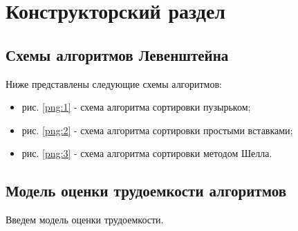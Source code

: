 \chapter{Конструкторский раздел}
\section{Схемы алгоритмов Левенштейна}
Ниже представлены следующие схемы алгоритмов:
\begin{itemize}
	\item рис. \ref{png:1} - схема алгоритма сортировки пузырьком;
	\item рис. \ref{png:2} - схема алгоритма сортировки простыми вставками;
	\item рис. \ref{png:3} - схема алгоритма сортировки методом Шелла.
\end{itemize}

\begin{figure}[H]
\end{figure} 

\begin{figure}[H]
\end{figure} 

\begin{figure}[H]
\end{figure}

\section{Модель оценки трудоемкости алгоритмов}
Введем модель оценки трудоемкости.

